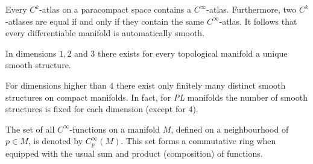    \begin{theorem}[Whitney]
        Every $C^k$-atlas on a paracompact space contains a $C^\infty$-atlas. Furthermore, two $C^k$-atlases are equal if and only if they contain the same $C^\infty$-atlas. It follows that every differentiable manifold is automatically smooth.
    \end{theorem}

    \begin{theorem}\label{manifold:rado_moise}
        In dimensions $1,2$ and $3$ there exists for every topological manifold a unique smooth structure.
    \end{theorem}
    \begin{theorem}
        For dimensions higher than $4$ there exist only finitely many distinct smooth structures on compact manifolds. In fact, for \textit{PL} manifolds the number of smooth structures is fixed for each dimension (except for $4$).
    \end{theorem}



    \begin{notation}
        The set of all $C^\infty$-functions on a manifold $M$, defined on a neighbourhood of $p\in M$, is denoted by $C^\infty_p(M)$. This set forms a commutative ring when equipped with the usual sum and product (composition) of functions.
    \end{notation}

